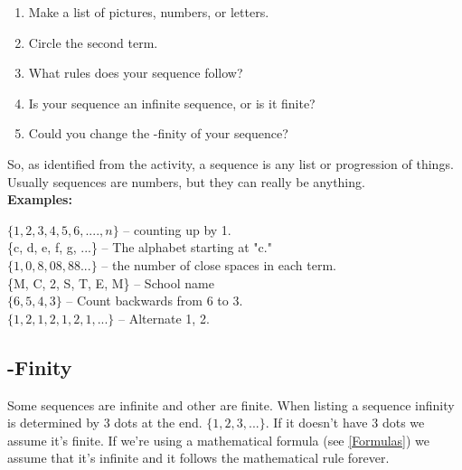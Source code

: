 \documentclass[12pt]{article}
\begin{document}
\begin{enumerate}

\item Make a list of pictures, numbers, or letters.

\item Circle the second term.

\item What rules does your sequence follow?	

\item Is your sequence an infinite sequence, or is it finite?

\item Could you change the -finity of your sequence?

\end{enumerate}

So, as identified from the activity, a sequence is any list or progression of things. Usually sequences are numbers, but they can really be anything. \\

\textbf{Examples:}\\

\begin{addmargin}[4em]{1em}

$\{1,2,3,4,5,6,....,n\}$ -- counting up by 1.\\

\{c, d, e, f, g, ...\} -- The alphabet starting at "c."\\

$\{1,0,8,08,88...\}$ -- the number of close spaces in each term.\\

\{M, C, 2, S, T, E, M\} -- School name\\

$\{6,5,4,3\}$ -- Count backwards from 6 to 3.\\

$\{1,2,1,2,1,2,1,...\}$ -- Alternate 1, 2.

\end{addmargin}

\subsection{-Finity}

Some sequences are infinite and other are finite. When listing a sequence infinity is determined by 3 dots at the end. $\{1,2,3,...\}$. If it doesn't have 3 dots we assume it's finite. If we're using a mathematical formula (see \ref{Formulas}) we assume that it's infinite and it follows the mathematical rule forever.
\end{document}
